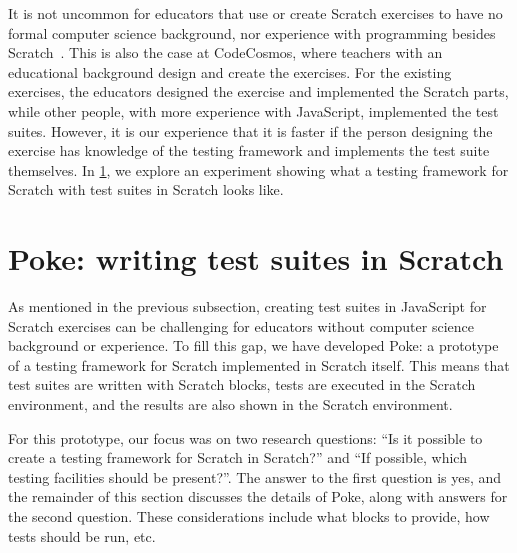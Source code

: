 \documentclass[../main]{subfiles}
\begin{document}
It is not uncommon for educators that use or create Scratch exercises to have no formal computer science background, nor experience with programming besides Scratch~\autocite{kimEnhancingTeachersICT2012,oliveiraIntroductionComputationalThinking2019}.
This is also the case at CodeCosmos, where teachers with an educational background design and create the exercises.
For the existing exercises, the educators designed the exercise and implemented the Scratch parts, while other people, with more experience with JavaScript, implemented the test suites.
However, it is our experience that it is faster if the person designing the exercise has knowledge of the testing framework and implements the test suite themselves.
In \cref{sec:poke:-a-testing-framework-written-in-scratch}, we explore an experiment showing what a testing framework for Scratch with test suites in Scratch looks like.

\section{Poke: writing test suites in Scratch}\label{sec:poke:-a-testing-framework-written-in-scratch}

As mentioned in the previous subsection, creating test suites in JavaScript for Scratch exercises can be challenging for educators without computer science background or experience.
To fill this gap, we have developed Poke: a prototype of a testing framework for Scratch implemented in Scratch itself.
This means that test suites are written with Scratch blocks, tests are executed in the Scratch environment, and the results are also shown in the Scratch environment.

For this prototype, our focus was on two research questions: ``Is it possible to create a testing framework for Scratch in Scratch?'' and ``If possible, which testing facilities should be present?''.
The answer to the first question is yes, and the remainder of this section discusses the details of Poke, along with answers for the second question.
These considerations include what blocks to provide, how tests should be run, etc.




\end{document}
